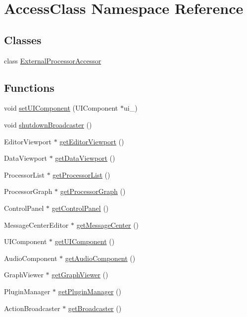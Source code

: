 \hypertarget{namespace_access_class}{}\section{Access\+Class Namespace Reference}
\label{namespace_access_class}
\subsection*{Classes}
\begin{DoxyCompactItemize}
\item 
class \mbox{\hyperlink{class_access_class_1_1_external_processor_accessor}{External\+Processor\+Accessor}}
\end{DoxyCompactItemize}
\subsection*{Functions}
\begin{DoxyCompactItemize}
\item 
void \mbox{\hyperlink{namespace_access_class_a4f1f8ce54b0d1e3d6319efe95c858e1b}{set\+U\+I\+Component}} (U\+I\+Component $\ast$ui\+\_\+)
\item 
void \mbox{\hyperlink{namespace_access_class_a7a20009ac4b41582f1379b6196f2c07c}{shutdown\+Broadcaster}} ()
\item 
Editor\+Viewport $\ast$ \mbox{\hyperlink{namespace_access_class_a53ff876e8fae76efe1766a3c6b5defc8}{get\+Editor\+Viewport}} ()
\item 
Data\+Viewport $\ast$ \mbox{\hyperlink{namespace_access_class_af26919b327fd17cb4a3ed79623f8795f}{get\+Data\+Viewport}} ()
\item 
Processor\+List $\ast$ \mbox{\hyperlink{namespace_access_class_af8981a34e6624add46145d2a3226c6c7}{get\+Processor\+List}} ()
\item 
Processor\+Graph $\ast$ \mbox{\hyperlink{namespace_access_class_ac50c3de3d49e5d88efb0bdef178523e7}{get\+Processor\+Graph}} ()
\item 
Control\+Panel $\ast$ \mbox{\hyperlink{namespace_access_class_a85b3fce72926c6c93cede477ed7f0dc1}{get\+Control\+Panel}} ()
\item 
Message\+Center\+Editor $\ast$ \mbox{\hyperlink{namespace_access_class_a32785f88b52c58ae0cd1fee7857c1730}{get\+Message\+Center}} ()
\item 
U\+I\+Component $\ast$ \mbox{\hyperlink{namespace_access_class_a847041f47180bab4dd27e7b379f71ce9}{get\+U\+I\+Component}} ()
\item 
Audio\+Component $\ast$ \mbox{\hyperlink{namespace_access_class_a6008b5597fd52fabd69ff28725717287}{get\+Audio\+Component}} ()
\item 
Graph\+Viewer $\ast$ \mbox{\hyperlink{namespace_access_class_a45a325e053c7e866aab251efa1d91008}{get\+Graph\+Viewer}} ()
\item 
Plugin\+Manager $\ast$ \mbox{\hyperlink{namespace_access_class_a23556c0c2fb931081168be89726b7419}{get\+Plugin\+Manager}} ()
\item 
Action\+Broadcaster $\ast$ \mbox{\hyperlink{namespace_access_class_abbdfc97a1cc576d5808d6c9958fdd84f}{get\+Broadcaster}} ()
\end{DoxyCompactItemize}


